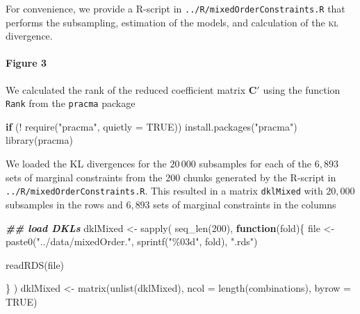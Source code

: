 \documentclass[
]{article}
\newenvironment{Shaded}{\begin{snugshade}}{\end{snugshade}}
\newcommand{\AttributeTok}[1]{\textcolor[rgb]{0.77,0.63,0.00}{#1}}
\newcommand{\ConstantTok}[1]{\textcolor[rgb]{0.00,0.00,0.00}{#1}}
\newcommand{\ControlFlowTok}[1]{\textcolor[rgb]{0.13,0.29,0.53}{\textbf{#1}}}
\newcommand{\DecValTok}[1]{\textcolor[rgb]{0.00,0.00,0.81}{#1}}
\newcommand{\DocumentationTok}[1]{\textcolor[rgb]{0.56,0.35,0.01}{\textbf{\textit{#1}}}}
\newcommand{\FunctionTok}[1]{\textcolor[rgb]{0.00,0.00,0.00}{#1}}
\newcommand{\NormalTok}[1]{#1}
\newcommand{\OtherTok}[1]{\textcolor[rgb]{0.56,0.35,0.01}{#1}}
\newcommand{\SpecialCharTok}[1]{\textcolor[rgb]{0.00,0.00,0.00}{#1}}
\newcommand{\StringTok}[1]{\textcolor[rgb]{0.31,0.60,0.02}{#1}}
\begin{document}
For convenience, we provide a R-script in
\texttt{../R/mixedOrderConstraints.R} that performs the subsampling,
estimation of the models, and calculation of the \textsc{kl} divergence.

\hypertarget{figure-3-1}{%
\paragraph{Figure 3}\label{figure-3-1}}

We calculated the rank of the reduced coefficient matrix \(\mathbf{C}'\)
using the function \texttt{Rank} from the \texttt{pracma} package

\begin{Shaded}
\begin{Highlighting}[]
\ControlFlowTok{if}\NormalTok{ (}\SpecialCharTok{!} \FunctionTok{require}\NormalTok{(}\StringTok{"pracma"}\NormalTok{, }\AttributeTok{quietly =} \ConstantTok{TRUE}\NormalTok{))}
  \FunctionTok{install.packages}\NormalTok{(}\StringTok{"pracma"}\NormalTok{)}
\FunctionTok{library}\NormalTok{(pracma)}
\end{Highlighting}
\end{Shaded}

We loaded the \textsc{KL} divergences for the \(20\,000\) subsamples for
each of the \(6,893\) sets of marginal constraints from the 200 chunks
generated by the R-script in \texttt{../R/mixedOrderConstraints.R}. This
resulted in a matrix \texttt{dklMixed} with \(20,000\) subsamples in the
rows and \(6,893\) sets of marginal constraints in the columns

\begin{Shaded}
\begin{Highlighting}[]
\DocumentationTok{\#\# load DKLs}
\NormalTok{dklMixed }\OtherTok{\textless{}{-}} \FunctionTok{sapply}\NormalTok{(}
    \FunctionTok{seq\_len}\NormalTok{(}\DecValTok{200}\NormalTok{),}
    \ControlFlowTok{function}\NormalTok{(fold)\{}
\NormalTok{        file }\OtherTok{\textless{}{-}} \FunctionTok{paste0}\NormalTok{(}\StringTok{"../data/mixedOrder."}\NormalTok{, }\FunctionTok{sprintf}\NormalTok{(}\StringTok{"\%03d"}\NormalTok{, fold), }\StringTok{".rds"}\NormalTok{)}
        
        \FunctionTok{readRDS}\NormalTok{(file)}
        
\NormalTok{    \}}
\NormalTok{)}
\NormalTok{dklMixed }\OtherTok{\textless{}{-}} \FunctionTok{matrix}\NormalTok{(}\FunctionTok{unlist}\NormalTok{(dklMixed), }\AttributeTok{ncol =} \FunctionTok{length}\NormalTok{(combinations), }\AttributeTok{byrow =} \ConstantTok{TRUE}\NormalTok{)}
\end{Highlighting}
\end{Shaded}
\end{document}
